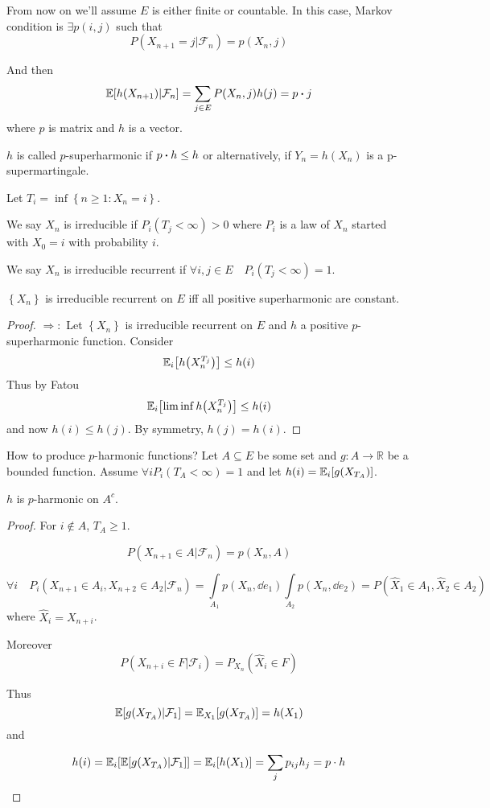 From now on we'll assume $E$ is either finite or countable. In this case, Markov condition is $\exists p(i,j)$ such that
$$P(X_{n+1} =j | \mathcal{F}_n) = p(X_n,j)$$

And then
$$\mathbb{E} [h(X_{n+1})|\mathcal{F}_n] = \sum_{j\in E} P(X_n, j)h(j) = p \vdot j$$
where $p$ is matrix and $h$ is a vector.

\begin{definition}
	$h$ is called $p$-superharmonic if $p\vdot h \leq h$ or alternatively, if
	$Y_n = h(X_n)$ is a p-supermartingale.
\end{definition}
\begin{definition}
	Let $T_i = \inf \left\{ n\geq 1: X_n=i \right\}$.
\end{definition}
\begin{definition}
	We say $X_n$ is irreducible if $P_i(T_j<\infty) > 0$ where $P_i$ is a law of $X_n$ started with $X_0=i$ with probability $i$.
\end{definition}
\begin{definition}
We say $X_n$ is irreducible recurrent if $\forall i,j \in E \quad P_i(T_j<\infty) = 1$.
\end{definition}
\begin{theorem}
	$\left\{X_n\right\}$ is irreducible recurrent on $E$ iff all positive superharmonic are constant.
	\begin{proof}
		$\Rightarrow:$
		Let $\left\{X_n\right\}$ is irreducible recurrent on $E$ and $h$ a positive $p$-superharmonic function. Consider $$\mathbb{E}_i \qty[h\qty(X_n^{T_j})] \leq h(i)$$
		Thus by Fatou
		$$\mathbb{E}_i \qty[\liminf h\qty(X_n^{T_j})] \leq h(i)$$
		and now $h(i) \leq h(j)$. By symmetry, $h(j) = h(i)$.
	\end{proof}
\end{theorem}

How to produce $p$-harmonic functions? Let $A\subseteq E$ be some set and $g: A\to \mathbb{R}$ be a bounded function. Assume $\forall i P_i(T_A <\infty) = 1$ and let $h(i) = \mathbb{E}_i \qty[g(X_{T_A})]$.

\begin{lemma}
	$h$ is $p$-harmonic on $A^c$.
	\begin{proof}
		For $i\notin A$, $T_A\geq 1$.
		
		$$P(X_{n+1}\in A | \mathcal{F}_n) = p(X_n, A)$$
		
		$$\forall i \quad P_i(X_{n+1}\in A_i, X_{n+2}\in A_2 | \mathcal{F}_n)  =\int\limits_{A_1} p(X_n, \dd{e_1})\int\limits_{A_2} p(X_n, \dd{e_2}) = P(\hat{X}_1\in A_1, \hat{X}_2\in A_2)$$
		where $\hat{X}_i = X_{n+i}$.
		
		Moreover 
		$$P(X_{n+i} \in F|\mathcal{F}_i) = P_{X_n} (\hat{X}_i \in F)$$
		
		Thus
		$$\mathbb{E} \qty[g(X_{T_A})|\mathcal{F}_1] = \mathbb{E}_{X_1} \qty[g(X_{T_A})] = h(X_1)$$
		and
		
		$$h(i) = \mathbb{E}_i \qty[\mathbb{E} \qty[g(X_{T_A})|\mathcal{F}_1]] = \mathbb{E}_i [h(X_1)] = \sum_j p_{ij} h_j = p\cdot h$$
	\end{proof}
\end{lemma}
